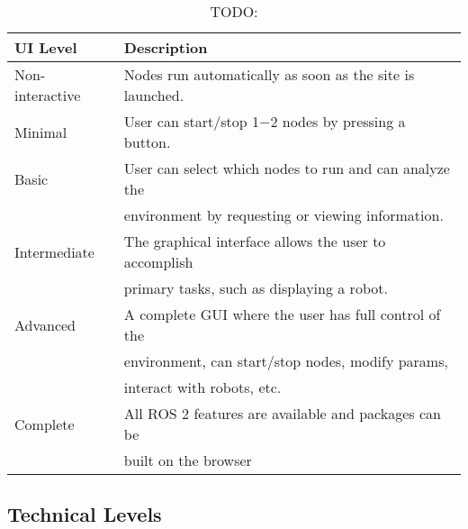         \begin{table}[htbp]
            \centering	
            \caption{TODO:}
                \begin{tabular}{ll}
                    \toprule
                    \textbf{UI Level} & \textbf{Description} \\
                    \midrule
                    Non-interactive & Nodes run automatically as soon as the site is launched. \\ [0.5em]

                    Minimal         & User can start/stop 1$-$2 nodes by pressing a button. \\[0.5em]

                    Basic           & User can select which nodes to run and can analyze the \\
                                    & environment by requesting or viewing information. \\[0.5em]

                    Intermediate    & The graphical interface allows the user to accomplish \\
                                    & primary tasks, such as displaying a robot. \\[0.5em]

                    Advanced        & A complete GUI where the user has full control of the \\
                                    & environment, can start/stop nodes, modify params, \\
                                    & interact with robots, etc. \\[0.5em]

                    Complete        & All ROS 2 features are available and packages can be \\
                                    & built on the browser \\
                \bottomrule
            \end{tabular}\label{tab:uilevels}
        \end{table}

    \subsection{Technical Levels}

